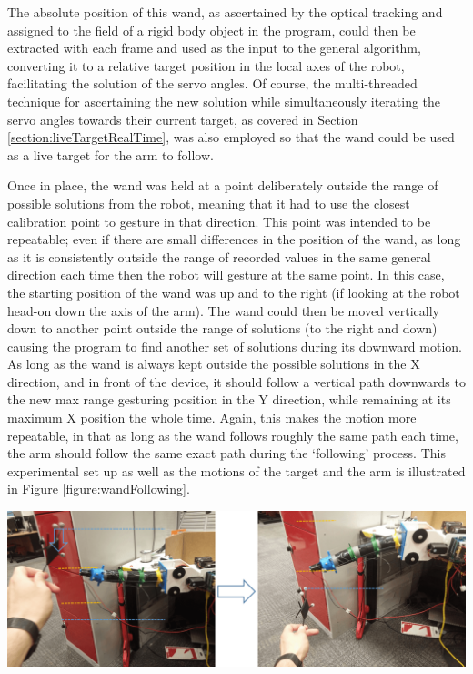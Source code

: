 \documentclass[11pt]{article}
\begin{document}
The absolute position of this wand, as ascertained by the optical tracking and assigned to the field of a rigid body object in the program, could then be extracted with each frame and used as the input to the general algorithm, converting it to a relative target position in the local axes of the robot, facilitating the solution of the servo angles. Of course, the multi-threaded technique for ascertaining the new solution while simultaneously iterating the servo angles towards their current target, as covered in Section \ref{section:liveTargetRealTime}, was also employed so that the wand could be used as a live target for the arm to follow.

Once in place, the wand was held at a point deliberately outside the range of possible solutions from the robot, meaning that it had to use the closest calibration point to gesture in that direction. This point was intended to be repeatable; even if there are small differences in the position of the wand, as long as it is consistently outside the range of recorded values in the same general direction each time then the robot will gesture at the same point. In this case, the starting position of the wand was up and to the right (if looking at the robot head-on down the axis of the arm). The wand could then be moved vertically down to another point outside the range of solutions (to the right and down) causing the program to find another set of solutions during its downward motion. As long as the wand is always kept outside the possible solutions in the X direction, and in front of the device, it should follow a vertical path downwards to the new max range gesturing position in the Y direction, while remaining at its maximum X position the whole time. Again, this makes the motion more repeatable, in that as long as the wand follows roughly the same path each time, the arm should follow the same exact path during the `following' process. This experimental set up as well as the motions of the target and the arm is illustrated in Figure \ref{figure:wandFollowing}.



\begin{center}
\includegraphics[width=\textwidth]{images/wandFollowing.png}
\label{figure:wandFollowing}
\end{center}
\end{document}
